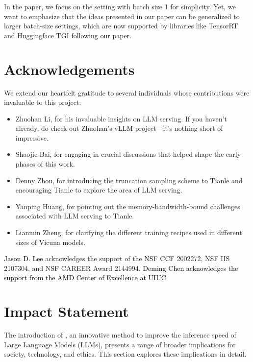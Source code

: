 In the paper, we focus on the setting with batch size 1 for simplicity. Yet, we want to emphasize that the ideas presented in our paper can be generalized to larger batch-size settings, which are now supported by libraries like TensorRT and Huggingface TGI following our paper. 

\section*{Acknowledgements}
We extend our heartfelt gratitude to several individuals whose contributions were invaluable to this project:
\begin{itemize}
    \item Zhuohan Li, for his invaluable insights on LLM serving. If you haven't already, do check out Zhuohan's vLLM project—it's nothing short of impressive.
    \item Shaojie Bai, for engaging in crucial discussions that helped shape the early phases of this work.
    \item Denny Zhou, for introducing the truncation sampling scheme to Tianle and encouraging Tianle to explore the area of LLM serving.
    \item Yanping Huang, for pointing out the memory-bandwidth-bound challenges associated with LLM serving to Tianle.
    \item Lianmin Zheng, for clarifying the different training recipes used in different sizes of Vicuna models.
\end{itemize}
\textcolor{black}{Jason D. Lee} acknowledges the support of the NSF CCF 2002272, NSF IIS 2107304, and NSF CAREER Award 2144994. \textcolor{black}{Deming Chen acknowledges the support from the AMD Center of Excellence at UIUC.}

\section*{Impact Statement}
The introduction of \ours, an innovative method to improve the inference speed of Large Language Models (LLMs), presents a range of broader implications for society, technology, and ethics. This section explores these implications in detail.

